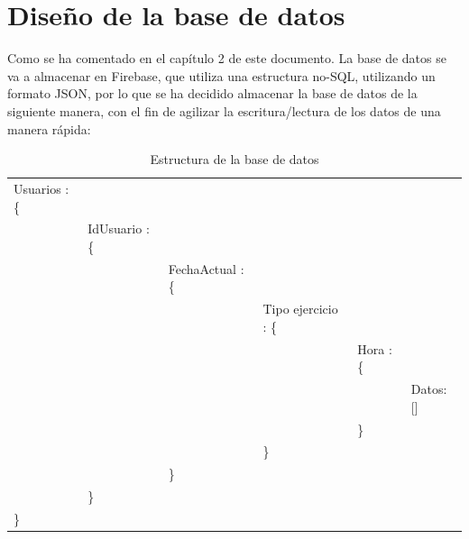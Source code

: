 \section{Diseño de la base de datos}

Como se ha comentado en el capítulo 2 de este documento. La base de datos se va a almacenar en Firebase, que utiliza una estructura no-SQL, utilizando un formato JSON, por lo que se ha decidido almacenar la base de datos de la siguiente manera, con el fin de agilizar la escritura/lectura de los datos de una manera rápida:

\begin{table}[H]
\centering
\caption{Estructura de la base de datos}
\label{Estructura de la base de datos}
\begin{tabular}{|llllll|}
\hline
Usuarios : \{ &           &             &                &      &       \\
         & IdUsuario : \{ &             &                &      &       \\
         &           & FechaActual : \{ &                &      &       \\
         &           &             & Tipo ejercicio : \{ &      &       \\
         &           &             &                & Hora : \{ &       \\
         &           &             &                &      & Datos: [] \\
         &           &             &                &      \}&  \\
         &           &             &               \}&      &  \\
         &           &             \}&               &      &  \\
         &           \}&             &               &      &  \\
         \}&           &             &               &      &  \\
\hline
\end{tabular}
\end{table}
